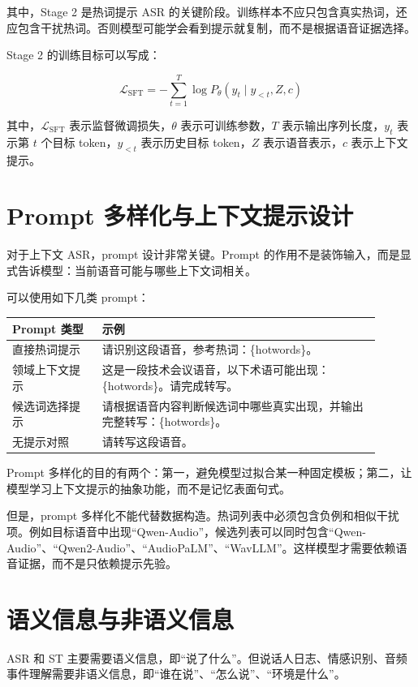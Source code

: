 \documentclass[UTF8,fontset=fandol]{ctexart}
\begin{document}
其中，Stage 2 是热词提示 ASR 的关键阶段。训练样本不应只包含真实热词，还应包含干扰热词。否则模型可能学会看到提示就复制，而不是根据语音证据选择。

Stage 2 的训练目标可以写成：

$$
\mathcal{L}_{\text{SFT}}
=
-\sum_{t=1}^{T}\log P_{\theta}(y_t \mid y_{<t}, Z, c)
$$

其中，$\mathcal{L}_{\text{SFT}}$ 表示监督微调损失，$\theta$ 表示可训练参数，$T$ 表示输出序列长度，$y_t$ 表示第 $t$ 个目标 token，$y_{<t}$ 表示历史目标 token，$Z$ 表示语音表示，$c$ 表示上下文提示。

\section{Prompt 多样化与上下文提示设计}

对于上下文 ASR，prompt 设计非常关键。Prompt 的作用不是装饰输入，而是显式告诉模型：当前语音可能与哪些上下文词相关。

可以使用如下几类 prompt：

\begin{longtable}{p{0.22\linewidth}p{0.68\linewidth}}
\toprule
Prompt 类型 & 示例 \\
\midrule
直接热词提示 & 请识别这段语音，参考热词：\{hotwords\}。 \\
\midrule
领域上下文提示 & 这是一段技术会议语音，以下术语可能出现：\{hotwords\}。请完成转写。 \\
\midrule
候选词选择提示 & 请根据语音内容判断候选词中哪些真实出现，并输出完整转写：\{hotwords\}。 \\
\midrule
无提示对照 & 请转写这段语音。 \\
\bottomrule
\end{longtable}

Prompt 多样化的目的有两个：第一，避免模型过拟合某一种固定模板；第二，让模型学习上下文提示的抽象功能，而不是记忆表面句式。

但是，prompt 多样化不能代替数据构造。热词列表中必须包含负例和相似干扰项。例如目标语音中出现``Qwen-Audio''，候选列表可以同时包含``Qwen-Audio''、``Qwen2-Audio''、``AudioPaLM''、``WavLLM''。这样模型才需要依赖语音证据，而不是只依赖提示先验。

\section{语义信息与非语义信息}

ASR 和 ST 主要需要语义信息，即``说了什么''。但说话人日志、情感识别、音频事件理解需要非语义信息，即``谁在说''、``怎么说''、``环境是什么''。
\end{document}
